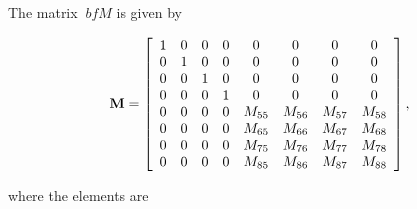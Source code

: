 \documentclass[sublist]{fei}
\begin{document}
The matrix \({\ bf M} \) is given by

\begin{equation} \label{leftMatrix}
    {\bf M} = \left[ \begin{array}{ccccccccc} 1 & 0 & 0 & 0 & 0 & 0 & 0 & 0 \\ 0 & 1 & 0 & 0 & 0 & 0 & 0 & 0 \\0 & 0 & 1 & 0 & 0 & 0 & 0 & 0 \\ 0 & 0 & 0 & 1 & 0 & 0 & 0 & 0 \\ 0 & 0 & 0 & 0 & M_{55} & M_{56} & M_{57} & M_{58} \\ 0 & 0 & 0 & 0 & M_{65} & M_{66} & M_{67} & M_{68} \\ 0 & 0 & 0 & 0 & M_{75} & M_{76} & M_{77} & M_{78} \\ 0 & 0 & 0 & 0 & M_{85} & M_{86} & M_{87} & M_{88} \end{array} \right],
\end{equation}

where the elements are
\end{document}

